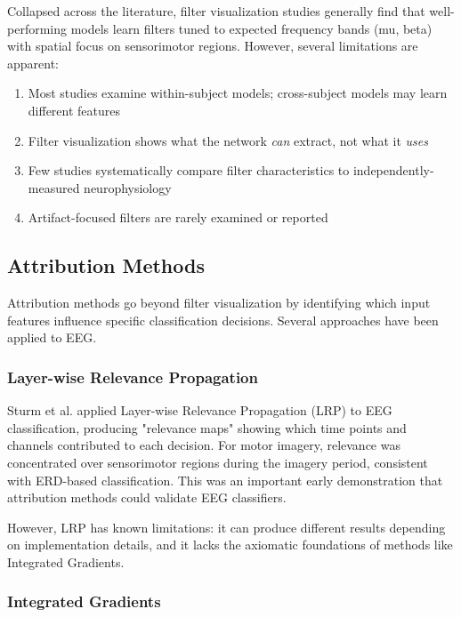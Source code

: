 Collapsed across the literature, filter visualization studies generally find that well-performing models learn filters tuned to expected frequency bands (mu, beta) with spatial focus on sensorimotor regions. However, several limitations are apparent:

\begin{enumerate}
    \item Most studies examine within-subject models; cross-subject models may learn different features
    \item Filter visualization shows what the network \textit{can} extract, not what it \textit{uses}
    \item Few studies systematically compare filter characteristics to independently-measured neurophysiology
    \item Artifact-focused filters are rarely examined or reported
\end{enumerate}


\subsection{Attribution Methods}
\label{subsec:rw_attribution}

Attribution methods go beyond filter visualization by identifying which input features influence specific classification decisions. Several approaches have been applied to EEG.

\subsubsection{Layer-wise Relevance Propagation}

Sturm et al. \cite{sturm2016lrp} applied Layer-wise Relevance Propagation (LRP) to EEG classification, producing "relevance maps" showing which time points and channels contributed to each decision. For motor imagery, relevance was concentrated over sensorimotor regions during the imagery period, consistent with ERD-based classification. This was an important early demonstration that attribution methods could validate EEG classifiers.

However, LRP has known limitations: it can produce different results depending on implementation details, and it lacks the axiomatic foundations of methods like Integrated Gradients.

\subsubsection{Integrated Gradients}


